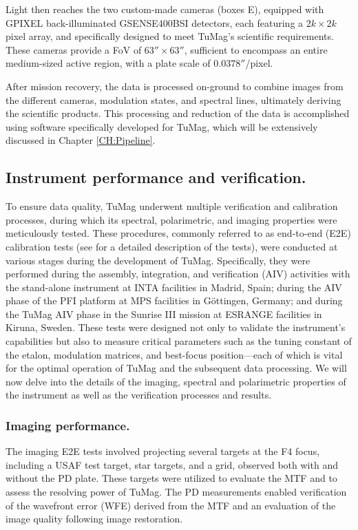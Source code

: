 Light then reaches the two custom-made cameras (boxes E), \citep{tumag-cams} equipped with GPIXEL back-illuminated GSENSE400BSI detectors, each featuring a $2k \times 2k$ pixel array, and specifically designed to meet TuMag's scientific requirements. These cameras provide a FoV of $63'' \times 63''$, sufficient to encompass an entire medium-sized active region, with a plate scale of $0.0378''$/pixel.

After mission recovery, the data is processed on-ground to combine images from the different cameras, modulation states, and spectral lines, ultimately deriving the scientific products. This processing and reduction of the data is accomplished using software specifically developed for TuMag, which will be extensively discussed in Chapter \ref{CH:Pipeline}. 

\subsection{Instrument performance and verification.}

To ensure data quality, TuMag underwent multiple verification and calibration processes, during which its spectral, polarimetric, and imaging properties were meticulously tested. These procedures, commonly referred to as end-to-end (E2E) calibration tests (see \cite{e2e-tests-inta} for a detailed description of the tests), were conducted at various stages during the development of TuMag. Specifically, they were performed during the assembly, integration, and verification (AIV) activities with the stand-alone instrument at INTA facilities in Madrid, Spain; during the AIV phase of the PFI platform at MPS facilities in Göttingen, Germany; and during the TuMag AIV phase in the Sunrise III mission at ESRANGE facilities in Kiruna, Sweden. These tests were designed not only to validate the instrument's capabilities but also to measure critical parameters such as the tuning constant of the etalon, modulation matrices, and best-focus position—each of which is vital for the optimal operation of TuMag and the subsequent data processing. We will now delve into the details of the imaging, spectral and polarimetric properties of the instrument as well as the verification processes and results.

\subsubsection{Imaging performance.}

The imaging E2E tests involved projecting several targets at the F4 focus, including a USAF test target, star targets, and a grid, observed both with and without the PD plate. These targets were utilized to evaluate the MTF and to assess the resolving power of TuMag. The PD measurements enabled verification of the wavefront error (WFE) derived from the MTF and an evaluation of the image quality following image restoration. 

